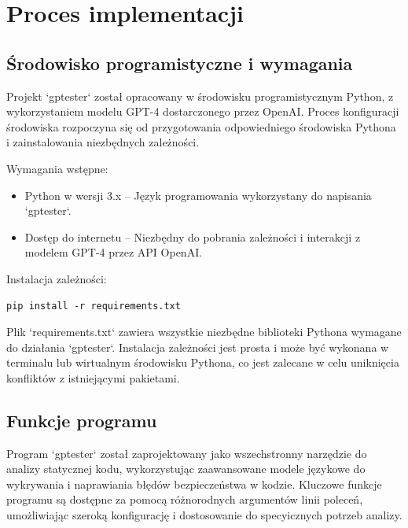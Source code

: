 \section{Proces implementacji}
\subsection{Środowisko programistyczne i wymagania}
\label{sec:srodowisko_i_wymagania}

Projekt `gptester` został opracowany w środowisku programistycznym Python, z wykorzystaniem modelu GPT-4 dostarczonego przez OpenAI. Proces konfiguracji środowiska rozpoczyna się od przygotowania odpowiedniego środowiska Pythona i zainstalowania niezbędnych zależności.

Wymagania wstępne:
\begin{itemize}
    \item Python w wersji 3.x – Język programowania wykorzystany do napisania `gptester`.
    \item Dostęp do internetu – Niezbędny do pobrania zależności i interakcji z modelem GPT-4 przez API OpenAI.
\end{itemize}

Instalacja zależności:
\begin{listing}
    \begin{verbatim}
pip install -r requirements.txt
\end{verbatim}
\end{listing}

Plik `requirements.txt` zawiera wszystkie niezbędne biblioteki Pythona wymagane do działania `gptester`. Instalacja zależności jest prosta i może być wykonana w terminalu lub wirtualnym środowisku Pythona, co jest zalecane w celu uniknięcia konfliktów z istniejącymi pakietami.



\subsection{Funkcje programu}
\label{sec:funkcje_programu}

Program `gptester` został zaprojektowany jako wszechstronny narzędzie do analizy statycznej kodu, wykorzystując zaawansowane modele językowe do wykrywania i naprawiania błędów bezpieczeństwa w kodzie. Kluczowe funkcje programu są dostępne za pomocą różnorodnych argumentów linii poleceń, umożliwiając szeroką konfigurację i dostosowanie do specyicznych potrzeb analizy.

